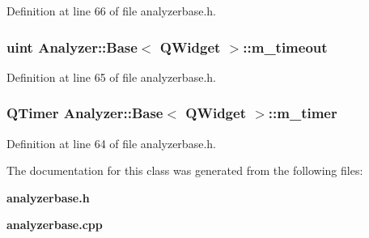 Definition at line 66 of file analyzerbase.h.
\subsubsection{\setlength{\rightskip}{0pt plus 5cm}uint {\bf Analyzer::Base}$<$ {\bf QWidget}  $>$::{\bf m\_\-timeout}\hspace{0.3cm}{\tt  [protected, inherited]}}\label{classAnalyzer_1_1Base_Analyzer_1_1Basep1}




Definition at line 65 of file analyzerbase.h.
\subsubsection{\setlength{\rightskip}{0pt plus 5cm}QTimer {\bf Analyzer::Base}$<$ {\bf QWidget}  $>$::{\bf m\_\-timer}\hspace{0.3cm}{\tt  [protected, inherited]}}\label{classAnalyzer_1_1Base_Analyzer_1_1Basep0}




Definition at line 64 of file analyzerbase.h.

The documentation for this class was generated from the following files:\begin{CompactItemize}
\item 
{\bf analyzerbase.h}\item 
{\bf analyzerbase.cpp}\end{CompactItemize}
